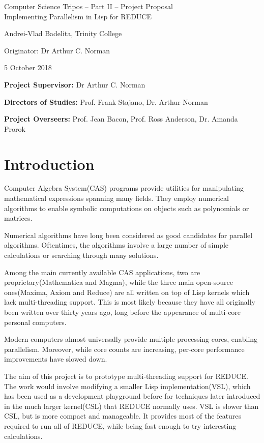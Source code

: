 \documentclass[12pt,a4paper,twoside]{article}
\begin{document}
\begin{center}
\Large
Computer Science Tripos -- Part II -- Project Proposal\\[4mm]
\LARGE
Implementing Parallelism in Lisp for REDUCE

\large
Andrei-Vlad Badelita, Trinity College

Originator: Dr Arthur C. Norman

5 October 2018
\end{center}

\vspace{5mm}

\textbf{Project Supervisor:} Dr Arthur C. Norman

\textbf{Directors of Studies:} Prof. Frank Stajano, Dr. Arthur Norman 

\textbf{Project Overseers:} Prof. Jean Bacon, Prof. Ross Anderson, Dr. Amanda Prorok


\section*{Introduction}

Computer Algebra System(CAS) programs provide utilities for manipulating mathematical expressions 
spanning many fields. They employ  numerical algorithms to enable symbolic computations
on objects such as polynomials or matrices.

Numerical algorithms have long been considered as good candidates for parallel algorithms.
Oftentimes, the algorithms involve a large number of simple calculations or searching through
many solutions.

Among the main currently available CAS applications, two are proprietary(Mathematica and Magma),
while the three main open-source ones(Maxima, Axiom and Reduce) are all written on top of Lisp
kernels which lack multi-threading support. This is most likely because they have all originally been
written over thirty years ago, long before the appearance of multi-core personal computers.

Modern computers almost universally provide multiple processing cores, enabling parallelism.
Moreover, while core counts are increasing, per-core performance improvements have slowed down.

The aim of this project is to prototype multi-threading support for REDUCE. The work would involve
modifying a smaller Lisp implementation(VSL), which has been used as a development playground
before for techniques later introduced in the much larger kernel(CSL) that REDUCE normally uses.
VSL is slower than CSL, but is more compact and manageable. It provides 
most of the features required to run all of REDUCE, while being fast enough to try
interesting calculations.
\end{document}
